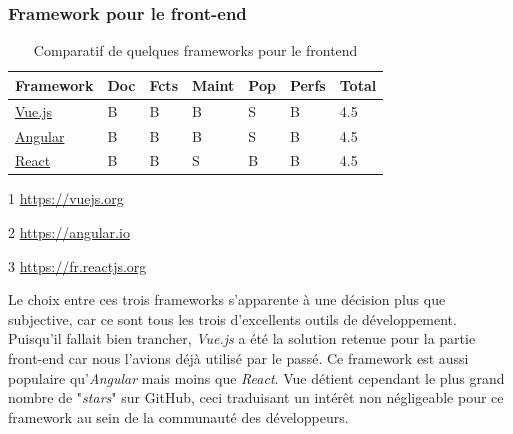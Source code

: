 \subsubsection*{Framework pour le front-end}
\begin{table}[H]
    \centering
    \begin{threeparttable}
    \begin{tabular}{| l | l | l | l | l | l | l |}
    \hline
        Framework & Doc & Fcts & Maint & Pop & Perfs & Total \\
    \hline
        \href{https://vuejs.org}{Vue.js}\tnote{1} &
        B &  
        B &
        B &            
        S &              
        B &
        4.5 \\
    \hline
        \href{https://angular.io}{Angular}\tnote{2} &
        B &                
        B &   
        B &
        S &              
        B &       
        4.5 \\
    \hline
        \href{https://fr.reactjs.org}{React}\tnote{3} &
        B &                
        B &     
        S &
        B &              
        B &       
        4.5 \\  
    \hline
    \end{tabular}
    \begin{tablenotes}
        \item[1] \url{https://vuejs.org}
        \item[2] \url{https://angular.io}
        \item[3] \url{https://fr.reactjs.org}
    \end{tablenotes}
    \end{threeparttable}
    \caption{Comparatif de quelques frameworks pour le \gls{frontend}}
    \label{table:compFrameworksFrontend}
\end{table}

Le choix entre ces trois frameworks s'apparente à une décision plus que subjective, car ce sont tous les trois d'excellents outils de développement. \\

Puisqu'il fallait bien trancher, \textit{Vue.js} a été la solution retenue pour la partie front-end car nous l'avions déjà utilisé par le passé. Ce framework est aussi populaire qu'\textit{Angular} mais moins que \textit{React}. Vue détient cependant le plus grand nombre de "\textit{stars}" sur GitHub, ceci traduisant un intérêt non négligeable pour ce framework au sein de la communauté des développeurs.\\

